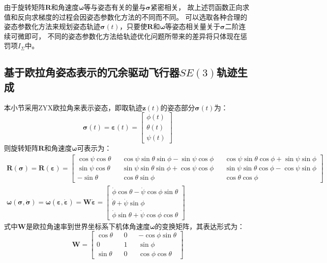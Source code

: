 由于旋转矩阵$\bm{R}$和角速度$\bm{\omega}$等与姿态有关的量与$\bm{\sigma}$紧密相关，
故上述罚函数正向求值和反向求梯度的过程会因姿态参数化方法的不同而不同。
可以选取各种合理的姿态参数化方法来规划姿态轨迹$\bm{\sigma}(t)$，只要使$\bm{R}$和$\bm{\omega}$等姿态相关量关于$\bm{\sigma}$二阶连续可微即可，
不同的姿态参数化方法给轨迹优化问题所带来的差异将只体现在惩罚项$I_\Sigma$中。

\subsection{基于欧拉角姿态表示的冗余驱动飞行器$SE(3)$轨迹生成}\label{subsec:planning_based_on_euler_angle}
本小节采用ZYX欧拉角来表示姿态，即取轨迹$\bm{z}(t)$的姿态部分$\bm{\sigma}(t)$为：
\begin{equation}
  \bm{\sigma}(t) = \bm{\varepsilon}(t) = 
  \begin{bmatrix}
    \phi(t) \\ \theta(t) \\ \psi(t)
  \end{bmatrix}
\end{equation}
则旋转矩阵$\bm{R}$和角速度$\bm{\omega}$可表示为： 
\begin{gather}
  \bm{R}(\bm{\sigma}) = \bm{R}(\bm{\varepsilon}) = 
  \begin{bmatrix}
    \cos\psi\cos\theta & & \cos\psi\sin\theta\sin\phi - \sin\psi\cos\phi & & \cos\psi\sin\theta\cos\phi + \sin\psi\sin\phi \\
    \sin\psi\cos\theta & & \sin\psi\sin\theta\sin\phi + \cos\psi\cos\phi & & \sin\psi\sin\theta\cos\phi - \cos\psi\sin\phi \\
    -\sin\theta & & \cos\theta\sin\phi & & \cos\theta\cos\phi
  \end{bmatrix} \label{equ:euler_angle_to_R}\\
  \bm{\omega}(\bm{\sigma}, \dot{\bm{\sigma}}) = \bm{\omega}(\bm{\varepsilon}, \dot{\bm{\varepsilon}}) = 
  \bm{W}\dot{\bm{\varepsilon}} = 
  \begin{bmatrix}
    \dot{\phi}\cos\theta - \dot{\psi}\cos\phi\sin\theta \\ 
    \dot{\theta} + \dot{\psi}\sin\phi \\ 
    \dot{\phi}\sin\theta + \dot{\psi}\cos\phi\cos\theta
  \end{bmatrix} \label{equ:euler_angle_to_omega}
\end{gather}
式中$\bm{W}$是欧拉角速率到世界坐标系下机体角速度$\bm{\omega}$的变换矩阵，其表达形式为：
\begin{equation}
  \bm{W} = 
  \begin{bmatrix}
    \cos\theta & & 0 & & -\cos\phi\sin\theta \\ 
    0 & & 1 & & \sin\phi \\
    \sin\theta & & 0 & & \cos\phi\cos\theta
  \end{bmatrix}
  \label{equ:W}
\end{equation}

